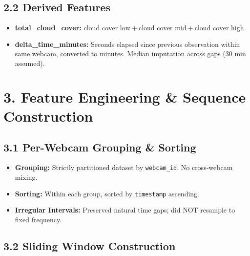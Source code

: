 \documentclass[11pt,a4paper]{article}
\begin{document}
\subsection{2.2 Derived Features}

\begin{itemize}
    \item \textbf{total\_cloud\_cover:} $\text{cloud\_cover\_low} + \text{cloud\_cover\_mid} + \text{cloud\_cover\_high}$
    \item \textbf{delta\_time\_minutes:} Seconds elapsed since previous observation within same webcam, converted to minutes. Median imputation across gaps (30 min assumed).
\end{itemize}

\section{3. Feature Engineering \& Sequence Construction}

\subsection{3.1 Per-Webcam Grouping \& Sorting}

\begin{itemize}
    \item \textbf{Grouping:} Strictly partitioned dataset by \texttt{webcam\_id}. No cross-webcam mixing.
    \item \textbf{Sorting:} Within each group, sorted by \texttt{timestamp} ascending.
    \item \textbf{Irregular Intervals:} Preserved natural time gaps; did NOT resample to fixed frequency.
\end{itemize}

\subsection{3.2 Sliding Window Construction}
\end{document}
